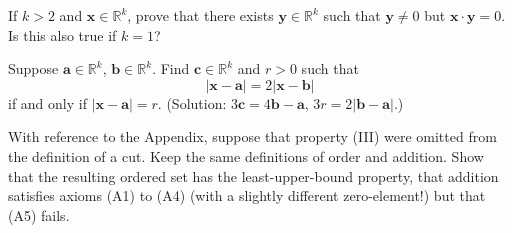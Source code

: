 \begin{myExercise}
    If $k >2$ and $\mathbf{x}\in \mathbb{R}^k$, prove that there exists $\mathbf{y} \in \mathbb{R}^k$ such that $\mathbf{y} \neq 0$ but $\mathbf{x}\cdot\mathbf{y} =0$.
    Is this also true if $k =1$?
\end{myExercise}

\begin{myExercise}
    Suppose $\mathbf{a} \in \mathbb{R}^k$, $\mathbf{b} \in\mathbb{R}^k$. Find $\mathbf{c} \in \mathbb{R}^k$ and $r > 0$ such that
    \begin{equation*}
        |\mathbf{x} - \mathbf{a}| = 2|\mathbf{x} - \mathbf{b}|
    \end{equation*}
    if and only if $|\mathbf{x} - \mathbf{a}| = r$.
    (Solution: $3\mathbf{c} =4\mathbf{b}-\mathbf{a}$, $3r =2|\mathbf{b}-\mathbf{a}|$.)
\end{myExercise}

\begin{myExercise}
    With reference to the Appendix, suppose that property (III) were omitted from the
    definition of a cut. Keep the same definitions of order and addition. Show that
    the resulting ordered set has the least-upper-bound property, that addition satisfies
    axioms (A1) to (A4) (with a slightly different zero-element!) but that (A5) fails.
\end{myExercise}
